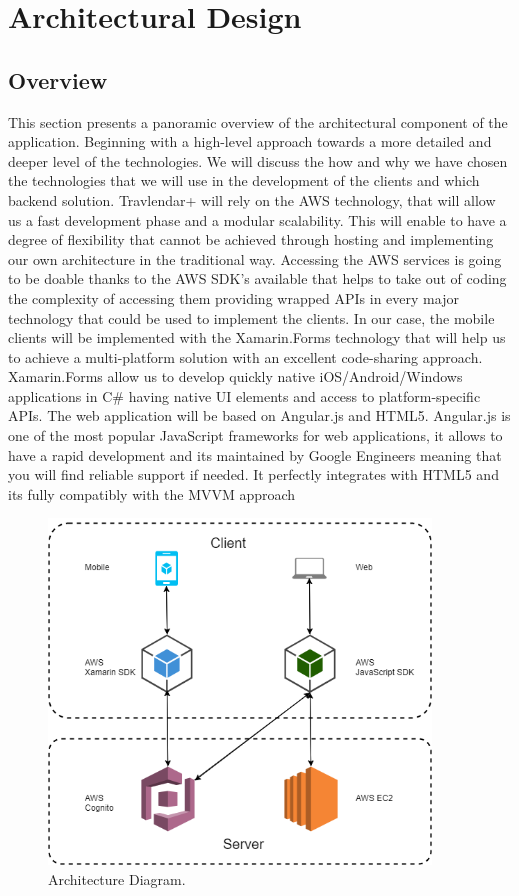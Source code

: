 \chapter{Architectural Design}
\label{cha:arch}
\section{Overview}
\label{sec:overview}
This section presents a panoramic overview of the architectural component of the application.
Beginning with a high-level approach towards a more detailed and deeper level of the technologies.
We will discuss the how and why we have chosen the technologies that we will use in the development of the clients and which backend solution.
\newline Travlendar+ will rely on the AWS technology, that will allow us a fast development phase and a modular scalability. 
This will enable to have a degree of flexibility that cannot be achieved through hosting and implementing our own architecture in the traditional way.
Accessing the AWS services is going to be doable thanks to the AWS SDK's available that helps to take out of coding the complexity of accessing them providing wrapped APIs in every major technology that could be used to implement the clients.
In our case, the mobile clients will be implemented with the Xamarin.Forms technology that will help us to achieve a multi-platform solution with an excellent code-sharing approach.
Xamarin.Forms allow us to develop quickly native iOS/Android/Windows applications in C\# having native UI elements and access to platform-specific APIs.
The web application will be based on Angular.js and HTML5.
Angular.js is one of the most popular JavaScript frameworks for web applications, it allows to have a rapid development and its maintained by Google Engineers meaning that you will find reliable support if needed.
It perfectly integrates with HTML5 and its fully compatibly with the MVVM approach

\begin{figure}[H]
	\centering
	\includegraphics[width=4in]{diagrams/ArchitectureDiagram.png} 
	\caption{Architecture Diagram.}   
\end{figure}

